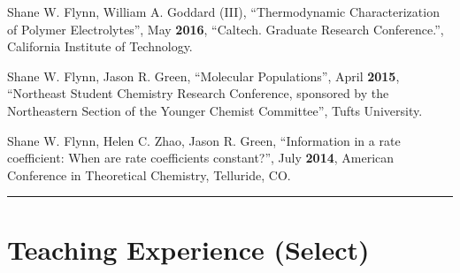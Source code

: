 \documentclass[letterpaper]{article}
\renewenvironment{itemize}{
  \begin{list}{}{
    \setlength{\leftmargin}{1.5em}
  }
}{
  \end{list}
}
\begin{document}
\begin{itemize}
\item Shane W. Flynn, William A. Goddard (III), ``Thermodynamic Characterization
      of Polymer Electrolytes'', May \textbf{2016}, ``Caltech. Graduate Research
      Conference.'', California Institute of Technology.

\item Shane W. Flynn, Jason R. Green, ``Molecular Populations'', April
      \textbf{2015}, ``Northeast Student Chemistry Research Conference,
      sponsored by the Northeastern Section of the Younger Chemist Committee'',
      Tufts University.

\item Shane W. Flynn, Helen C. Zhao, Jason R. Green, ``Information in a rate
      coefficient: When are rate coefficients constant?'', July \textbf{2014},
      American Conference in Theoretical Chemistry, Telluride, CO.

\end{itemize}

\vspace{0.1in}
\hrule

\section*{Teaching Experience (Select)}
\end{document}
